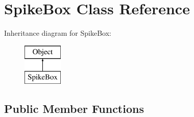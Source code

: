 \hypertarget{class_spike_box}{}\section{Spike\+Box Class Reference}
\label{class_spike_box}
Inheritance diagram for Spike\+Box\+:\begin{figure}[H]
\begin{center}
\leavevmode
\includegraphics[height=2.000000cm]{class_spike_box}
\end{center}
\end{figure}
\subsection*{Public Member Functions}
